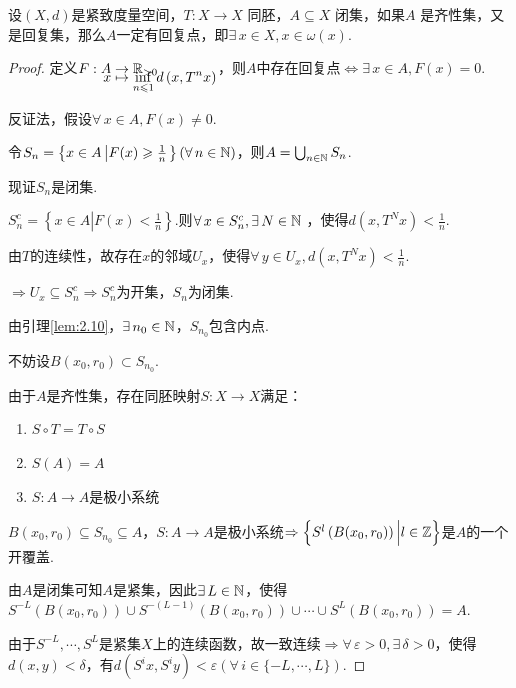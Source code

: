 \begin{lemma}
    设$(X,d)$是紧致度量空间，$T:X\to X$ 同胚，$A\subseteq X$ 闭集，如果$A$ 是齐性集，又是回复集，那么$A$一定有回复点，即$\exists\, x\in X,x\in\omega(x)$.
\end{lemma}
\begin{proof}
    定义$\setjot[-6]\begin{aligned}[t]
        F:A&\to \mb{R}_{>0} \\
        x&\mapsto\inf_{n\leq 1}{d \left(x,T^nx\right)}
    \end{aligned}$，则$A$中存在回复点$\iff\exists\, x\in A,F(x)=0$.\par
    反证法，假设$\forall\, x\in A,F(x)\neq 0$.\par
    令$S_n=\left\{x\in A\left|F(x)\geqslant\frac{1}{n}\right.\right\}(\forall\, n\in\mathbb{N})$，则$A=\bigcup_{n\in\mathbb{N}}{S_n}$.\par
    现证$S_n$是闭集.\par
    $S_n^c=\left\{x\in A\left|F(x)<\frac{1}{n}\right.\right\}$.则$\forall\, x\in S_n^c,\exists\, N\in\mathbb{N}$ ，使得$d \left(x,T^Nx\right)<\frac{1}{n}$.\par
    由$T$的连续性，故存在$x$的邻域$U_x$，使得$\forall\, y\in U_x,d \left(x,T^Nx\right)<\frac{1}{n}$.\par
    $\Rightarrow U_x\subseteq S_n^c\Rightarrow S_n^c$为开集，$S_n$为闭集.\par
    由引理\ref{lem:2.10}，$\exists\, n_0\in\mathbb{N}$，$S_{n_0}$包含内点.\par
    不妨设$B(x_0,r_0)\subset S_{n_0}$.\par
    由于$A$是齐性集，存在同胚映射$S:X\to X$满足： \par
    \begin{enumerate}[leftmargin=4em,label=(\arabic*)]
        \item $S\circ T=T\circ S$
        \item $S(A)=A$
        \item $S:A\to A$是极小系统
    \end{enumerate}\par
    $B(x_0,r_0)\subseteq S_{n_0}\subseteq A$，$S:A\to A$是极小系统$\Rightarrow \left\{S^l \left(B(x_0,r_0)\right)\Big| l\in\mathbb{Z}\right\}$是$A$的一个开覆盖.\par
    由$A$是闭集可知$A$是紧集，因此$\exists\, L\in\mathbb{N}$，使得$S^{-L}\left(B(x_0,r_0)\right)\cup S^{-(L-1)}\left(B(x_0,r_0)\right)\cup\cdots\cup S^{L}\left(B(x_0,r_0)\right)=A$.\par
    由于$S^{-L},\cdots,S^L$是紧集$X$上的连续函数，故一致连续$\Rightarrow\forall\,\varepsilon>0,\exists\,\delta>0$，使得$d(x,y)<\delta$，有$d \left(S^ix,S^iy\right)<\varepsilon(\forall\, i\in\{-L,\cdots,L\})$.\par

\end{proof}
